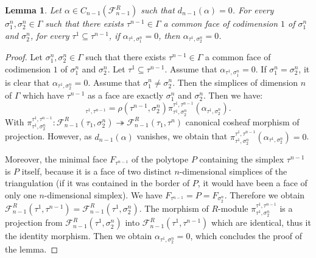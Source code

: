 \documentclass{article}
\newtheorem{lemma}{Lemma}
\begin{document}
\begin{lemma}
    Let $\alpha \in C_{n-1}(\mathcal{F}_{n-1}^{R})$ such that $d_{n-1}(\alpha) = 0$. For every $\sigma^n_1,\sigma^n_2 \in \Gamma$ such that there exists $\tau^{n-1} \in \Gamma$ a common face of codimension $1$ of $\sigma^n_1$ and $\sigma^n_2$, for every $\tau^1 \subseteq \tau^{n-1}$, if $\alpha_{\tau^{1},\sigma^n_1} = 0$, then $\alpha_{\tau^{1},\sigma^n_2} = 0$.
    \label{rt}
\end{lemma}

\begin{proof}
    Let $\sigma^n_1,\sigma^n_2 \in \Gamma$ such that there exists $\tau^{n-1} \in \Gamma$ a common face of codimension $1$ of $\sigma^n_1$ and $\sigma^n_2$. Let $\tau^1 \subseteq \tau^{n-1}$. Assume that $\alpha_{\tau^{1},\sigma^n_1} = 0$. If $\sigma^n_1 = \sigma^n_2$, it is clear that $\alpha_{\tau^{1},\sigma^n_2} = 0$. Assume that $\sigma^n_1 \neq \sigma^n_2$. Then the simplices of dimension $n$ of $\Gamma$ which have $\tau^{n-1}$ as a face are exactly $\sigma^n_1$ and $\sigma^n_2$. Then we have:
    \begin{equation*}
        [d_{n-1}(\alpha)]_{\tau^{1},\tau^{n-1}} = \rho(\tau^{n-1},\sigma^n_2) \pi_{\tau^{1},\sigma^n_2}^{\tau^{1},\tau^{n-1}}(\alpha_{\tau^{1},\sigma^n_2}).
    \end{equation*}
    With $\pi_{\tau^{1},\sigma^n_2}^{\tau^{1},\tau^{n-1}}:\mathcal{F}_{n-1}^R(\tau_1,\sigma_2^{n})\twoheadrightarrow \mathcal{F}_{n-1}^R(\tau_1,\tau^n)$ canonical cosheaf morphism of projection. However, as $d_{n-1}(\alpha)$ vanishes, we obtain that $\pi_{\tau^{1},\sigma^n_2}^{\tau^{1},\tau^{n-1}}(\alpha_{\tau^{1},\sigma^n_2}) = 0$.

    Moreover, the minimal face $F_{\tau^{n-1}}$ of the polytope $P$ containing the simplex $\tau^{n-1}$ is $P$ itself, because it is a face of two distinct $n$-dimensional simplices of the triangulation (if it was contained in the border of $P$, it would have been a face of only one $n$-dimensional simplex). We have $F_{\tau^{n-1}} = P = F_{\sigma^n_2}$. Therefore we obtain $\mathcal{F}_{n-1}^{R}(\tau^1,\tau^{n-1}) = \mathcal{F}_{n-1}^{R}(\tau^1,\sigma^n_2)$. The morphism of $R$-module $\pi_{\tau^{1},\sigma^n_2}^{\tau^{1},\tau^{n-1}}$ is a projection from $\mathcal{F}_{n-1}^{R}(\tau^1,\sigma^n_2)$ into $\mathcal{F}_{n-1}^{R}(\tau^1,\tau^{n-1})$ which are identical, thus it the identity morphism. Then we obtain $\alpha_{\tau^{1},\sigma^n_2} = 0$, which concludes the proof of the lemma.
\end{proof}
\end{document}
